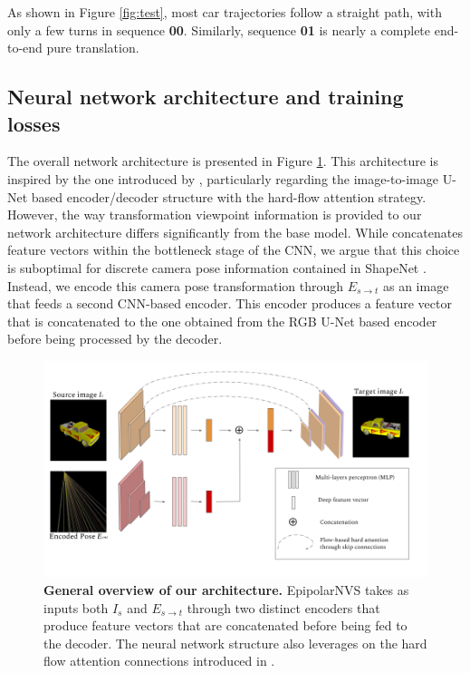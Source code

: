   
As shown in Figure \ref{fig:test}, most car trajectories follow a straight path, with only a few turns in sequence \textbf{00}. Similarly, sequence \textbf{01} is nearly a complete end-to-end pure translation.

\subsection{Neural network architecture and training losses}

The overall network architecture is presented in Figure \ref{fig:architecture}. This architecture is inspired by the one introduced by \citep{kim2020novel}, particularly regarding the image-to-image U-Net based encoder/decoder structure with the hard-flow attention strategy. However, the way transformation viewpoint information is provided to our network architecture differs significantly from the base model. While \citep{kim2020novel} concatenates feature vectors within the bottleneck stage of the \ac{CNN}, we argue that this choice is suboptimal for discrete camera pose information contained in ShapeNet \citep{chang2015shapenet}. Instead, we encode this camera pose transformation through $E_{s\xrightarrow{}t}$ as an image that feeds a second \ac{CNN}-based encoder. This encoder produces a feature vector that is concatenated to the one obtained from the RGB U-Net based encoder before being processed by the decoder. 

\begin{figure}[h!]
  \begin{center}
  \includegraphics[width=\textwidth]{images/epipolarnvs/NetworkArchitecture.png}
  \end{center}
  \caption{\textbf{General overview of our architecture.} EpipolarNVS takes as inputs both $I_s$ and $E_{s\xrightarrow{}t}$ through two distinct encoders that produce feature vectors that are concatenated before being fed to the decoder. The neural network structure also leverages on the hard flow attention connections introduced in \citep{kim2020novel}.}
  \label{fig:architecture}
\end{figure}

